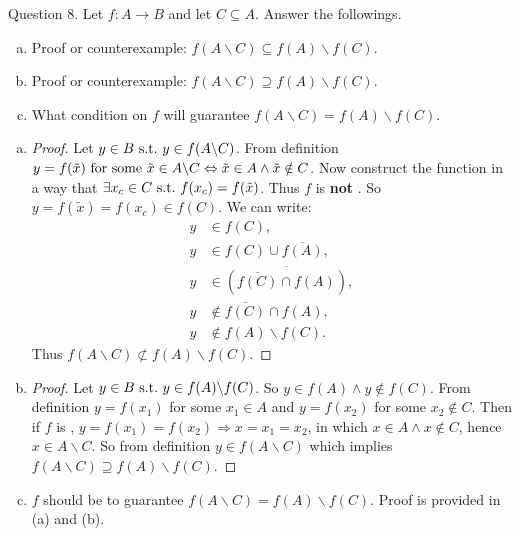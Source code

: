 \begin{question}
	{Question 8}. Let $f: A \rightarrow B$ and let $C \subseteq A$. Answer the followings.
	\begin{enumerate}[(a)]
		\item Proof or counterexample: $f(A\backslash C) \subseteq f(A) \backslash f(C)$.
		\item Proof or counterexample: $f(A\backslash C) \supseteq f(A) \backslash f(C)$.	
		\item What condition on $f$ will guarantee $f(A\backslash C) = f(A) \backslash f(C)$. \\

	\end{enumerate}
	\begin{ans}
		\begin{enumerate}[(a)]
			\item \begin{proof}
				Let $y \in B \ \text{s.t.}\  y \in f(A \backslash C)$. From definition $y = f(\tilde{x})\ \text{for some}\ \tilde{x} \in A \backslash C \Leftrightarrow \tilde{x} \in A \wedge \tilde{x} \notin C$. Now construct the function in a way that $\exists x_c \in C \ \text{s.t.}\  f(x_c) = f(\tilde{x})$. Thus $f$ is \textbf{not} \oo. So $y = f(\tilde{x}) = f(x_c) \in f(C)$. We can write:
				\begin{align*}
					y &\in f(C), \\
					y &\in f(C) \cup \overline{f(A)}, \\
					y &\in \overline{(\overline{f(C)} \cap f(A))}, \\
					y &\notin \overline{f(C)} \cap f(A),\\
					y &\notin f(A) \backslash f(C).
				\end{align*}
				Thus $f(A\backslash C) \nsubset f(A) \backslash f(C)$.
			\end{proof}
			
			\item \begin{proof}
				Let $y \in B \ \text{s.t.}\  y \in f(A) \backslash f(C)$. So $y \in f(A) \wedge y \notin f(C)$. From definition $y = f(x_1)$ for some $x_1 \in A$ and $y = f(x_2)$ for some $x_2 \notin C$. Then if $f$ is \oo, $y=f(x_1) = f(x_2) \Rightarrow x = x_1 = x_2$, in which $x \in A \wedge x \notin C$, hence $x \in A\backslash C$. So from definition $y \in f(A\backslash C)$ which implies $f(A\backslash C) \supseteq f(A) \backslash f(C)$.
			\end{proof}
			
			\item $f$ should be \oo to guarantee $f(A\backslash C) = f(A) \backslash f(C)$. Proof is provided in (a) and (b).
		\end{enumerate}
	\end{ans}
\end{question}
\newpage

